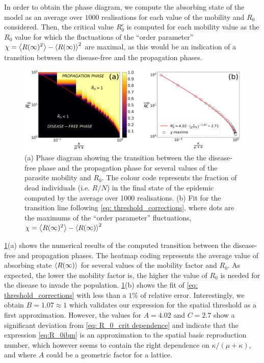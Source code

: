 In order to obtain the phase diagram, we compute the absorbing state of the
model as an average over $1000$ realisations for each value of the mobility and
$R_0$ considered. Then, the critical value $R_0^c$ is computed for each
mobility value as the $R_0$ value for which the fluctuations of the ``order
parameter'' $\displaystyle \chi=\left<{R(\infty})^2\right>-\left<R(\infty)\right>^2$ are
maximal, as this would be an indication of a transition between the
disease-free and the propagation phases.

\begin{figure}[H]
    \centering
    \includegraphics[width=1\textwidth]{Figures/PhaseDiagram.png}
    \caption{(a) Phase diagram showing the transition between the the
        disease-free phase and the propagation phase for several values of the
        parasite
        mobility and $R_0$. The colour code represents the fraction of dead
        individuals
        (i.e. $R/N$) in the final state of the epidemic computed by the average
        over
        1000 realisations. (b) Fit for the transition line following \cref{eq:
            threshold_corrections}, where dots are the maximums of the ``order
        parameter''
        fluctuations, $\chi=\left<{R(\infty})^2\right>-\left<R(\infty)\right>^2$}
    \label{fig:Phase_diagram}
\end{figure}

\cref{fig:Phase_diagram}(a) shows the numerical results of the computed
transition between the disease-free and propagation phases. The heatmap coding
represents the average value of absorbing state $\left<R(\infty)\right>$ for several
values of the mobility factor and $R_0$. As expected, the lower the mobility
factor is, the higher the value of $R_0$ is needed for the disease to invade
the population. \cref{fig:Phase_diagram}(b) shows the fit of \cref{eq:
    threshold_corrections} with less than a $1\%$ of relative error.
Interestingly,
we obtain $B=1.07\approx1$ which validates our expression for the spatial
threshold as a first approximation. However, the values for $A=4.02$ and
$C=2.7$ show a significant deviation from \cref{eq: R_0_crit dependence} and
indicate that the expression \cref{eq:R_0ibm} is  an approximation to the
spatial basic reproduction number, which however seems to contain the right
dependence on $\kappa/(\mu+\kappa)$, and where $A$ could be a geometric factor
for a lattice.


